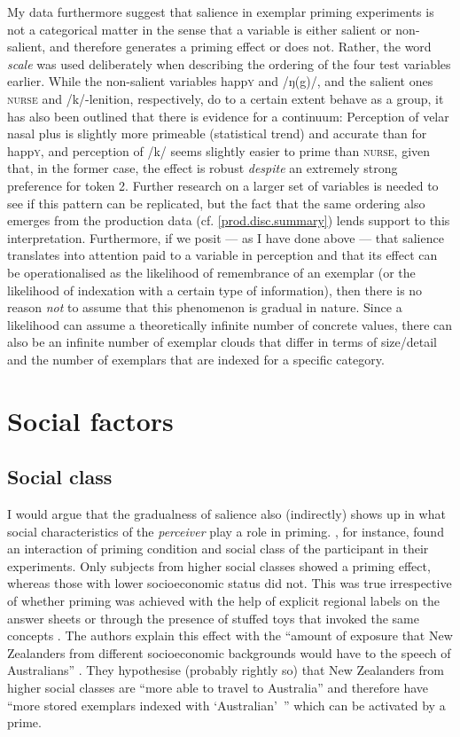 My data furthermore suggest that salience in exemplar priming experiments is not a categorical matter in the sense that a variable is either salient or non-salient, and therefore generates a priming effect or does not.
Rather, the word \emph{scale} was used deliberately when describing the ordering of the four test variables earlier.
While the non-salient variables happ\textsc{y} and /ŋ(g)/, and the salient ones \textsc{nurse} and /k/-lenition, respectively, do to a certain extent behave as a group, it has also been outlined that there is evidence for a continuum: Perception of velar nasal plus is slightly more primeable (statistical trend) and accurate than for happ\textsc{y}, and perception of /k/ seems slightly easier to prime than \textsc{nurse}, given that, in the former case, the effect is robust \emph{despite} an extremely strong preference for token 2.
Further research on a larger set of variables is needed to see if this pattern can be replicated, but the fact that the same ordering also emerges from the production data (cf. \ref{prod.disc.summary}) lends support to this interpretation.
Furthermore, if we posit --- as I have done above --- that salience translates into attention paid to a variable in perception and that its effect can be operationalised as the likelihood of remembrance of an exemplar (or the likelihood of indexation with a certain type of information), then there is no reason \emph{not} to assume that this phenomenon is gradual in nature.
Since a likelihood can assume a theoretically infinite number of concrete values, there can also be an infinite number of exemplar clouds that differ in terms of size/detail and the number of exemplars that are indexed for a specific category.

	\section{Social factors}
		\label{sec.perc_res.disc.social}

		\subsection{Social class}

I would argue that the gradualness of salience also (indirectly) shows up in what social characteristics of the \emph{perceiver} play a role in priming.
\textcite{hayetal2006a,haydrager2010}, for instance, found an interaction of priming condition and social class of the participant in their experiments.
Only subjects from higher social classes showed a priming effect, whereas those with lower socioeconomic status did not.
This was true irrespective of whether priming was achieved with the help of explicit regional labels on the answer sheets or through the presence of stuffed toys that invoked the same concepts \parencite[cf.][878]{haydrager2010}.
The authors explain this effect with the ``amount of exposure  that New Zealanders from different socioeconomic backgrounds would have to the speech of Australians'' \parencite[878]{haydrager2010}.
They hypothesise (probably rightly so) that New Zealanders from higher social classes are ``more able to travel to Australia'' and therefore have ``more stored exemplars indexed with `Australian'~'' which can be activated by a prime.

